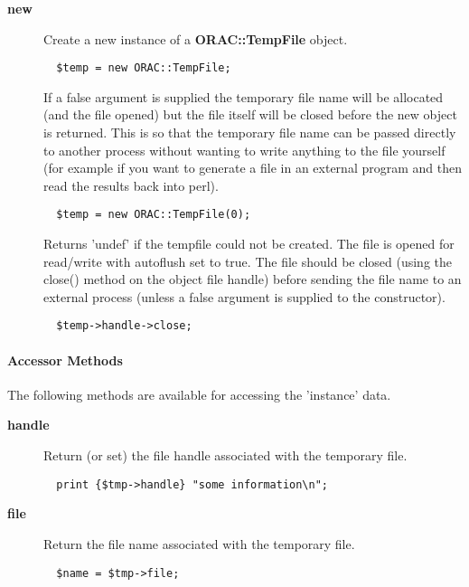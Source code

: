 \begin{description}
\item[\textbf{new}] \mbox{}

Create a new instance of a \textbf{ORAC::TempFile} object.

\begin{verbatim}
  $temp = new ORAC::TempFile;
\end{verbatim}


If a false argument is supplied the temporary file
name will be allocated (and the file opened) but the 
file itself will be closed before the new object is returned.
This is so that the temporary file name can be passed directly
to another process without wanting to write anything to the
file yourself (for example if you want to generate a file
in an external program and then read the results back into
perl).

\begin{verbatim}
  $temp = new ORAC::TempFile(0);
\end{verbatim}


Returns 'undef' if the tempfile could not be created.
The file is opened for read/write with autoflush set to true.
The file should be closed (using the close() method on the
object file handle) before sending the file name to an external
process (unless a false argument is supplied to the constructor).

\begin{verbatim}
  $temp->handle->close;
\end{verbatim}
\end{description}
\paragraph*{Accessor Methods\label{ORAC::TempFile_Accessor_Methods}}

The following methods are available for accessing the 
'instance' data.

\begin{description}
\item[\textbf{handle}] \mbox{}

Return (or set) the file handle associated with the temporary 
file.

\begin{verbatim}
  print {$tmp->handle} "some information\n";
\end{verbatim}
\item[\textbf{file}] \mbox{}

Return the file name associated with the temporary file.

\begin{verbatim}
  $name = $tmp->file;
\end{verbatim}
\end{description}
